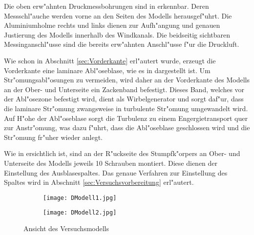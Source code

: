Die oben erw"ahnten Druckmessbohrungen sind in  erkennbar. Deren Messschl"auche werden vorne an den Seiten des Modells herausgef"uhrt. Die Aluminiumholme rechts und links dienen zur Aufh"angung und genauen Justierung des Modells innerhalb des Windkanals. Die beidseitig sichtbaren Messinganschl"usse sind die bereits erw"ahnten Anschl"usse f"ur die Druckluft.

Wie schon in Abschnitt \ref{sec:Vorderkante} erl"autert wurde, erzeugt die Vorderkante eine laminare Abl"oseblase, wie es in  dargestellt ist. Um Str"omungsabl"osungen zu vermeiden, wird daher an der Vorderkante des Modells an der Ober- und Unterseite ein Zackenband befestigt. Dieses Band, welches vor der Abl"osezone befestigt wird, dient als Wirbelgenerator und sorgt daf"ur, dass die laminare Str"omung zwangsweise in turbulente Str"omung umgewandelt wird. Auf H"ohe der Abl"oseblase sorgt die Turbulenz zu einem Engergietransport quer zur Anstr"omung, was dazu f"uhrt, dass die Abl"oseblase geschlossen wird und die Str"omung fr"uher wieder anlegt.

Wie in  ersichtlich ist, sind an der R"uckseite des Stumpfk"orpers an Ober- und Unterseite des Modells jeweils 10 Schrauben montiert. Diese dienen der Einstellung des Ausblasespaltes. Das genaue Verfahren zur Einstellung des Spaltes wird in Abschnitt \ref{sec:Versuchsvorbereitung} erl"autert.


\begin{figure}[h]
	\centering
	\begin{subfigure}[c]{0.49\textwidth}		
		\texttt{[image: DModell1.jpg]}
		\label{fig:DModell1}
	\end{subfigure}
	\begin{subfigure}[c]{0.49\textwidth}
		\texttt{[image: DModell2.jpg]}
		\label{fig:DModell2}
	\end{subfigure}
	\caption{Ansicht des Versuchsmodells}
	\label{fig:DModell}
\end{figure}



